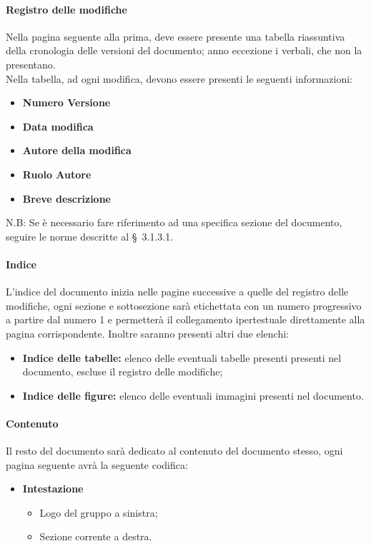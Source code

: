 \documentclass[11pt,a4paper]{article}
\begin{document}
{	\paragraph{Registro delle modifiche\\}
	Nella pagina seguente alla prima, deve essere presente una tabella riassuntiva della cronologia delle versioni del documento; anno eccezione i verbali, che non la presentano. \\
	Nella tabella, ad ogni modifica, devono essere presenti le seguenti informazioni:
	
	\begin{itemize}
		\item \textbf{Numero Versione}
		\item \textbf{Data modifica}
		\item \textbf{Autore della modifica}
		\item \textbf{Ruolo Autore}
		\item \textbf{Breve descrizione}
	\end{itemize}
	
	N.B: Se è necessario fare riferimento ad una specifica sezione del documento, seguire le norme descritte al \S\ 3.1.3.1.
	\paragraph{Indice\\}
	L'indice del documento inizia nelle pagine successive a quelle del registro delle modifiche, ogni sezione e sottosezione sarà etichettata con un numero progressivo a partire dal numero 1 e permetterà il collegamento ipertestuale direttamente alla pagina corrispondente. Inoltre saranno presenti altri due elenchi:
	
	\begin{itemize}
		\item \textbf{Indice delle tabelle:} elenco delle eventuali tabelle presenti presenti nel documento, escluse il registro delle modifiche;
		\item  \textbf{Indice delle figure:} elenco delle eventuali immagini presenti nel documento. 
	\end{itemize}
	
	\paragraph{Contenuto\\}
	Il resto del documento sarà dedicato al contenuto del documento stesso, ogni pagina seguente avrà la seguente codifica:
	\begin{itemize}
		\item \textbf{Intestazione}
		\begin{itemize}
			\item Logo del gruppo a sinistra;
			\item Sezione corrente a destra.
		\end{itemize}
		

\end{itemize}}
\end{document}
